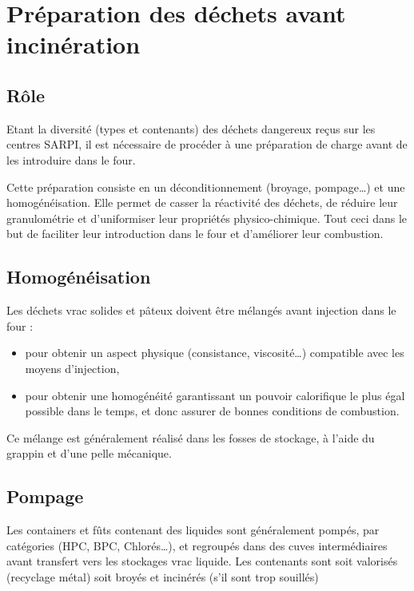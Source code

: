 \section{Préparation des déchets avant incinération}

\subsection{Rôle}

Etant la diversité (types et contenants) des déchets dangereux reçus sur les centres SARPI, il est nécessaire de procéder à une préparation de charge avant de les introduire dans le four.
\vspace{0.3cm}

Cette préparation consiste en un déconditionnement (broyage, pompage…) et une homogénéisation. Elle permet de casser la réactivité des déchets, de réduire leur granulométrie et d’uniformiser leur propriétés physico-chimique. Tout ceci dans le but de faciliter leur introduction dans le four et d’améliorer leur combustion.

\subsection{Homogénéisation}
Les déchets vrac solides et pâteux doivent être mélangés avant injection dans le four :


\begin{itemize}
 
\item	pour obtenir un aspect physique (consistance, viscosité…) compatible avec les moyens d’injection,
\item	pour obtenir une homogénéité garantissant un pouvoir calorifique le plus égal possible dans le temps, et donc assurer de bonnes conditions de combustion.

\end{itemize}

Ce mélange est généralement réalisé dans les fosses de stockage, à l’aide du grappin et d’une pelle mécanique.

\subsection{Pompage}
Les containers et fûts contenant des liquides sont généralement pompés, par catégories (HPC, BPC, Chlorés…), et regroupés dans des cuves intermédiaires avant transfert vers les stockages vrac liquide.
Les contenants sont soit valorisés (recyclage métal) soit broyés et incinérés (s’il sont trop souillés)


